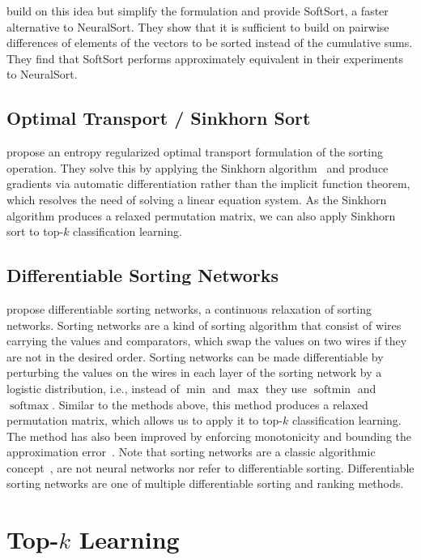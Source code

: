 \documentclass{article}
\newcommand{\revA}[1]{{#1}}
\begin{document}
\citet{prillo2020softsort} build on this idea but simplify the formulation and provide SoftSort, a faster alternative to NeuralSort.
They show that it is sufficient to build on pairwise differences of elements of the vectors to be sorted instead of the cumulative sums.
They find that SoftSort performs approximately equivalent in their experiments to NeuralSort.


\subsection{Optimal Transport / Sinkhorn Sort}
\citet{Cuturi2019-SortingOT} propose an entropy regularized optimal transport formulation of the sorting operation.
They solve this by applying the Sinkhorn algorithm~\citep{Cuturi13Sinkhorn} and produce gradients via automatic differentiation rather than the implicit function theorem, which resolves the need of solving a linear equation system.
As the Sinkhorn algorithm produces a relaxed permutation matrix, we can also apply Sinkhorn sort to top-$k$ classification learning.

\subsection{Differentiable Sorting Networks}
\citet{Petersen2021-diffsort} propose differentiable sorting networks, a continuous relaxation of sorting networks.
\revA{Sorting networks are a kind of sorting algorithm that consist of wires carrying the values and comparators, which swap the values on two wires if they are not in the desired order. 
Sorting networks can be made differentiable by perturbing the values on the wires in each layer of the sorting network by a logistic distribution, i.e., instead of $\min$ and $\max$ they use $\operatorname{softmin}$ and $\operatorname{softmax}$.}
Similar to the methods above, this method produces a relaxed permutation matrix, which allows us to apply it to top-$k$ classification learning.
The method has also been improved by enforcing monotonicity and bounding the approximation error~\cite{petersen2022monotonic}.
\revA{Note that sorting networks are a classic algorithmic concept~\citep{Knuth1998-3-SortingSearching}, are not neural networks nor refer to differentiable sorting.
Differentiable sorting networks are one of multiple differentiable sorting and ranking methods.
}







\section{Top-$k$ Learning}
\end{document}
